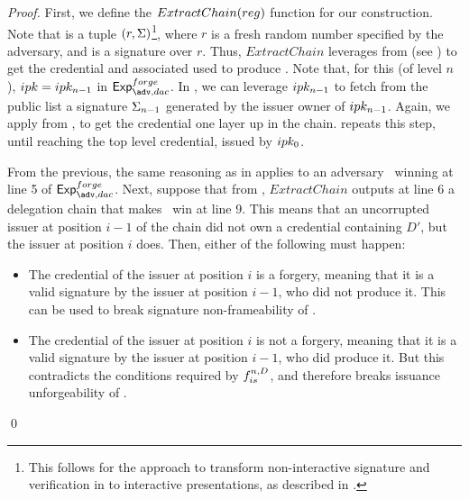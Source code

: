 \begin{proof}
  First, we define the $ExtractChain(reg)$ function for our construction.
  Note that \utrans is a tuple $(r,\Sigma)$\footnote{This follows for the approach
    to transform non-interactive signature and verification in \UAS to
    interactive presentations, as described in .}, where
  $r$ is a fresh random number specified by the adversary,
  and \Sig is a \CUASGen signature over $r$. Thus, $ExtractChain$ leverages
  \ExtractSign from \CUASGen (see ) to get the
  credential and associated \ipk used to produce \Sig. Note that, for this
  \ipk (of level $n$), $ipk = ipk_{n-1}$ in $\Exp^{forge}_{\adv,dac}$. In
  \CUASDAC, we can leverage $ipk_{n-1}$ to fetch from the public list a
  signature $\Sigma_{n-1}$ generated by the issuer owner of $ipk_{n-1}$. Again,
  we apply \ExtractSign from \CUASGen, to get the credential one layer up in the
  chain.  repeats this step, until reaching the top level
  credential, issued by $ipk_0$.

  From the previous, the same reasoning as in  applies
  to an adversary \adv~winning at line 5 of $\Exp^{forge}_{\adv,dac}$. Next,
  suppose that from \utrans, $ExtractChain$ outputs at line 6 a
  delegation chain that makes \adv~win at line 9. This means that an
  uncorrupted issuer at position $i-1$ of the chain did not own a credential
  containing $D'$, but the issuer at position $i$ does. Then, either of the
  following must happen:

  \begin{itemize}
  \item The credential of the issuer at position $i$ is a forgery, meaning that
    it is a valid signature by the issuer at position $i-1$, who did not produce
    it. This can be used to break signature non-frameability of \CUASGenInt.
  \item The credential of the issuer at position $i$ is not a forgery, meaning
    that it is a valid signature by the issuer at position $i-1$, who did
    produce it. But this contradicts the conditions required by $f_{is}^{n,D}$,
    and therefore breaks issuance unforgeability of \CUASGenInt.
  \end{itemize}
  \qed
\end{proof}

